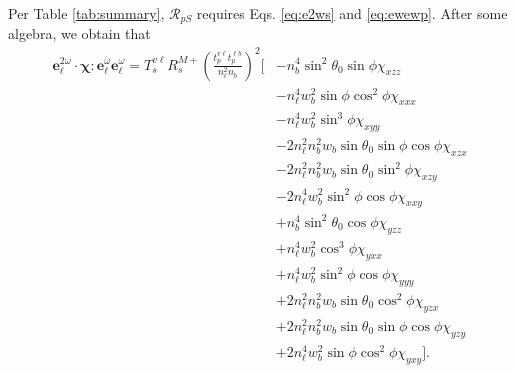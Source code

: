 Per Table \ref{tab:summary}, $\mathcal{R}_{pS}$ requires Eqs. \eqref{eq:e2ws}
and \eqref{eq:ewewp}. After some algebra, we obtain that
\begin{equation*}
\begin{split}
\mathbf{e}^{2\omega}_{\ell}\cdot\boldsymbol{\chi}:
\mathbf{e}^{\omega}_{\ell}\mathbf{e}^{\omega}_{\ell}
= T_{s}^{v\ell}R^{M+}_{s}
\left(\frac{t^{v\ell}_{p}t^{\ell b}_{p}}
{n^{2}_{\ell}n_{b}}\right)^{2}
\big[
&- n^{4}_{b}\sin^{2}\theta_{0}\sin\phi\chi_{xzz}\\
&- n^{4}_{\ell}w^{2}_{b}\sin\phi\cos^{2}\phi\chi_{xxx}\\
&- n^{4}_{\ell}w^{2}_{b}\sin^{3}\phi\chi_{xyy}\\
&- 2n^{2}_{\ell}n^{2}_{b}w_{b}\sin\theta_{0}\sin\phi\cos\phi\chi_{xzx}\\
&- 2n^{2}_{\ell}n^{2}_{b}w_{b}\sin\theta_{0}\sin^{2}\phi\chi_{xzy}\\
&- 2n^{4}_{\ell}w^{2}_{b}\sin^{2}\phi\cos\phi\chi_{xxy}\\
&+ n^{4}_{b}\sin^{2}\theta_{0}\cos\phi\chi_{yzz}\\
&+ n^{4}_{\ell}w^{2}_{b}\cos^{3}\phi\chi_{yxx}\\
&+ n^{4}_{\ell}w^{2}_{b}\sin^{2}\phi\cos\phi\chi_{yyy}\\
&+ 2n^{2}_{\ell}n^{2}_{b}w_{b}\sin\theta_{0}\cos^{2}\phi\chi_{yzx}\\
&+ 2n^{2}_{\ell}n^{2}_{b}w_{b}\sin\theta_{0}\sin\phi\cos\phi\chi_{yzy}\\
&+ 2n^{4}_{\ell}w^{2}_{b}\sin\phi\cos^{2}\phi\chi_{yxy}
\big].
\end{split}
\end{equation*}

